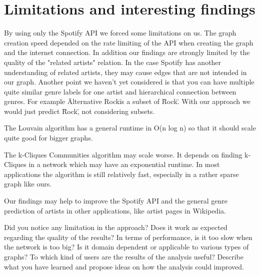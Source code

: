 \documentclass[11pt,a4paper,onecolumn,notitlepage]{article}
\begin{document}
\section{Limitations and interesting findings}
By using only the Spotify API we forced some limitations on us. The graph creation speed depended on the rate limiting of the API when creating the graph and the internet connection. In addition our findings are strongly limited by the quality of the "related artists" relation. In the case Spotify has another understanding of related artists, they may cause edges that are not intended in our graph. Another point we haven't yet considered is that you can have multiple quite similar genre labels for one artist and hierarchical connection between genres. For example \"Alternative Rock\" is a subset of \"Rock\". With our approach we would just predict \"Rock\", not considering subsets.

The Louvain algorithm has a general runtime in O(n log n) so that it should scale quite good for bigger graphs.

The k-Cliques Communities algorithm may scale worse. It depends on finding k-Cliques in a network which may have an exponential runtime. In most applications the algorithm is still relatively fast, especially in a rather sparse graph like ours.

Our findings may help to improve the Spotify API and the general genre prediction of artists in other applications, like artist pages in Wikipedia.

Did you notice any limitation in the approach? Does it work as expected regarding the quality of the results? In terms of performance, is it too slow when the network is too big? Is it domain dependent or applicable to various types of graphs? To which kind of users are the results of the analysis useful? Describe what you have learned and propose ideas on how the analysis could improved. 




  
\end{document}

